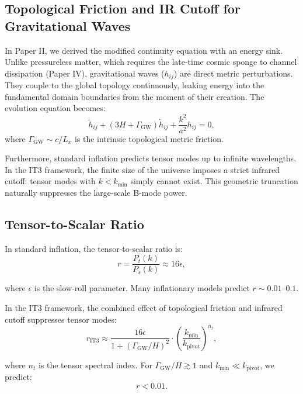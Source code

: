 \documentclass[12pt,a4paper]{article}
\begin{document}
\subsection{Topological Friction and IR Cutoff for Gravitational Waves}

In Paper II, we derived the modified continuity equation with an energy sink. Unlike pressureless matter, which requires the late-time cosmic sponge to channel dissipation (Paper IV), gravitational waves ($h_{ij}$) are direct metric perturbations. They couple to the global topology continuously, leaking energy into the fundamental domain boundaries from the moment of their creation. The evolution equation becomes:
\begin{equation}
\ddot{h}_{ij} + (3H + \Gamma_{\mathrm{GW}}) \dot{h}_{ij} + \frac{k^2}{a^2} h_{ij} = 0,
\label{eq:tensor}
\end{equation}
where $\Gamma_{\mathrm{GW}} \sim c/L_x$ is the intrinsic topological metric friction.

Furthermore, standard inflation predicts tensor modes up to infinite wavelengths. In the IT3 framework, the finite size of the universe imposes a strict infrared cutoff: tensor modes with $k < k_{\min}$ simply cannot exist. This geometric truncation naturally suppresses the large-scale B-mode power.

\subsection{Tensor-to-Scalar Ratio}

In standard inflation, the tensor-to-scalar ratio is:
\begin{equation}
r = \frac{P_t(k)}{P_s(k)} \approx 16\epsilon,
\end{equation}

where $\epsilon$ is the slow-roll parameter. Many inflationary models predict $r \sim 0.01\text{--}0.1$.

In the IT3 framework, the combined effect of topological friction and infrared cutoff suppresses tensor modes:
\begin{equation}
r_{\mathrm{IT3}} \approx \frac{16\epsilon}{1 + (\Gamma_{\mathrm{GW}}/H)^2} \cdot \left(\frac{k_{\min}}{k_{\mathrm{pivot}}}\right)^{n_t},
\end{equation}

where $n_t$ is the tensor spectral index. For $\Gamma_{\mathrm{GW}}/H \gtrsim 1$ and $k_{\min} \ll k_{\mathrm{pivot}}$, we predict:
\begin{equation}
r < 0.01.
\end{equation}
\end{document}
